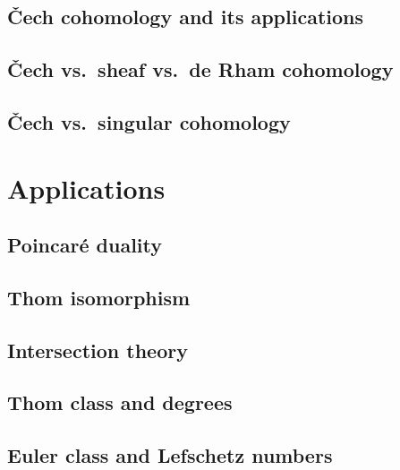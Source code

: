 \section{\v Cech cohomology and its applications}

\section{\v Cech  vs.\ sheaf vs.\ de Rham cohomology}

\section{\v Cech vs.\ singular cohomology}




\chapter{Applications \texorpdfstring{\ucmark}{}}

\section{Poincar\'e duality}

\section{Thom isomorphism}

\section{Intersection theory}



\section{Thom class and degrees}

\section{Euler class and Lefschetz numbers}


